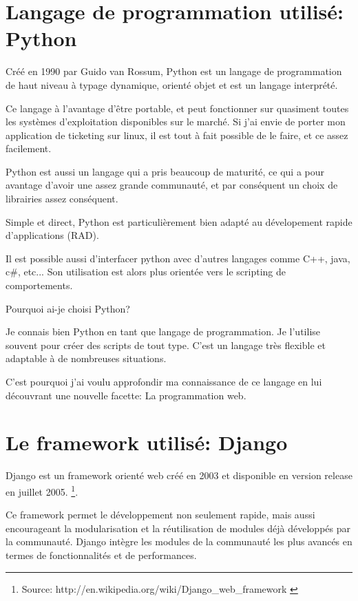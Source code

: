 \documentclass[12pt,table,a4paper]{report}
\begin{document}
\section{Langage de programmation utilisé: Python}
Créé en 1990 par Guido van Rossum, Python est un langage de programmation de haut niveau à typage dynamique, orienté objet et est un langage interprété.

Ce langage à l'avantage d'être portable, et peut fonctionner sur quasiment toutes les systèmes d'exploitation disponibles sur le marché. Si j'ai envie de porter mon application de ticketing sur linux, il est tout à fait possible de le faire, et ce assez facilement.

Python est aussi un langage qui a pris beaucoup de maturité, ce qui a pour avantage d'avoir une assez grande communauté, et par conséquent un choix de librairies assez conséquent.

Simple et direct, Python est particulièrement bien adapté au dévelopement rapide d'applications (RAD).

Il est possible aussi d'interfacer python avec d'autres langages comme C++, java, c\#, etc... Son utilisation est alors plus orientée vers le scripting de comportements.

\begin{center}
Pourquoi ai-je choisi Python? 
\end{center}

Je connais bien Python en tant que langage de programmation. Je l'utilise souvent pour créer des scripts de tout type. C'est un langage très flexible et adaptable à de nombreuses situations.

C'est pourquoi j'ai voulu approfondir ma connaissance de ce langage en lui découvrant une nouvelle facette: La programmation web.

\section{Le framework utilisé: Django}
Django est un framework orienté web créé en 2003 et disponible en version release en juillet 2005. \footnote{Source: http://en.wikipedia.org/wiki/Django\_web\_framework \label{DjangoWikipediaArticle}}.

Ce framework permet le développement non seulement rapide, mais aussi encourageant la modularisation et la réutilisation de modules déjà développés par la communauté. Django intègre les modules de la communauté les plus avancés en termes de fonctionnalités et de performances.
\end{document}
